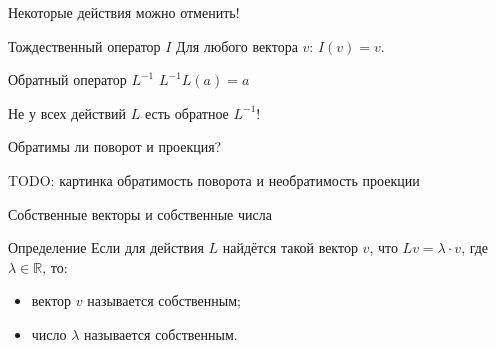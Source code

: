 \documentclass[14pt,xcolor=dvipsnames]{beamer}
\newcommand\R{\mathbb{R}}
\begin{document}
\begin{frame}{Некоторые действия можно отменить!}

\begin{block}{Тождественный оператор $I$}
  Для любого вектора $v$: $I(v) = v$. 
\end{block}

\begin{block}{Обратный оператор $L^{-1}$}
  $L^{-1}L(a) = a$ 

Не у всех действий $L$ есть обратное $L^{-1}$!
\end{block}

\end{frame}
  

\begin{frame}{Обратимы ли поворот и проекция?}

\begin{block}{TODO: картинка обратимость поворота и необратимость проекции}
\end{block}

\end{frame}
  

\begin{frame}{Собственные векторы и собственные числа}

  
\begin{block}{Определение}
  Если для действия $L$ найдётся такой вектор $v$, что $Lv=\lambda \cdot v$, где $\lambda \in \R$, то:
  \begin{itemize}
    \item вектор $v$ называется собственным;
    \item число $\lambda$ называется собственным.
  \end{itemize} 
\end{block}
  
\end{frame}
\end{document}
